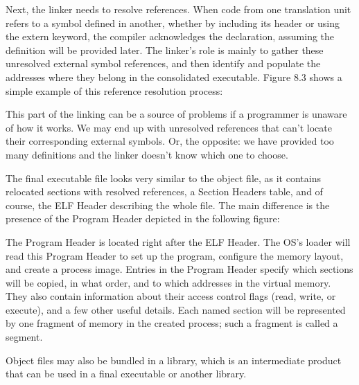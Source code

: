 
Next, the linker needs to resolve references. When code from one translation unit refers to a symbol defined in another, whether by including its header or using the extern keyword, the compiler acknowledges the declaration, assuming the definition will be provided later. The linker’s role is mainly to gather these unresolved external symbol references, and then identify and populate the addresses where they belong in the consolidated executable. Figure 8.3 shows a simple example of this reference resolution process:


This part of the linking can be a source of problems if a programmer is unaware of how it works. We may end up with unresolved references that can’t locate their corresponding external symbols. Or, the opposite: we have provided too many definitions and the linker doesn’t know which one to choose.

The final executable file looks very similar to the object file, as it contains relocated sections with resolved references, a Section Headers table, and of course, the ELF Header describing the whole file. The main difference is the presence of the Program Header depicted in the following figure:


The Program Header is located right after the ELF Header. The OS’s loader will read this Program Header to set up the program, configure the memory layout, and create a process image. Entries in the Program Header specify which sections will be copied, in what order, and to which addresses in the virtual memory. They also contain information about their access control flags (read, write, or execute), and a few other useful details. Each named section will be represented by one fragment of memory in the created process; such a fragment is called a segment.

Object files may also be bundled in a library, which is an intermediate product that can be used in a final executable or another library.

